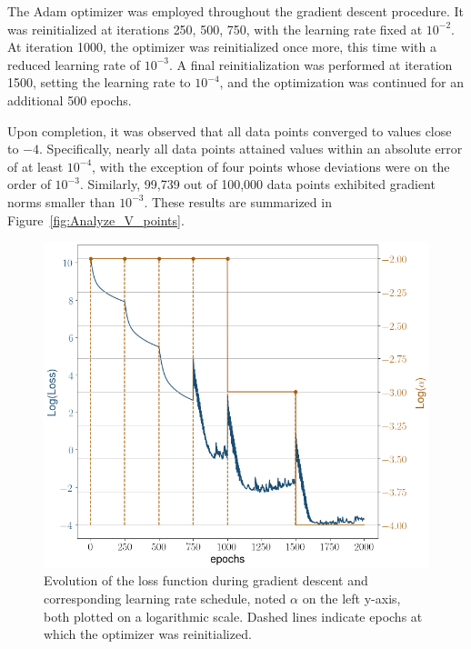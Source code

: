 \documentclass[11pt]{article}
\begin{document}
		The Adam optimizer was employed throughout the gradient descent procedure. It was reinitialized at iterations {250, 500, 750}, with the learning rate fixed at $10^{-2}$. At iteration 1000, the optimizer was reinitialized once more, this time with a reduced learning rate of $10^{-3}$. A final reinitialization was performed at iteration 1500, setting the learning rate to $10^{-4}$, and the optimization was continued for an additional 500 epochs.
		
		Upon completion, it was observed that all data points converged to values close to $-4$. Specifically, nearly all data points attained values within an absolute error of at least $10^{-4}$, with the exception of four points whose deviations were on the order of $10^{-3}$. Similarly, 99,739 out of 100,000 data points exhibited gradient norms smaller than $10^{-3}$. These results are summarized in Figure~\ref{fig:Analyze_V_points}.
		
		\begin{figure}[h!]
			\centering
			\includegraphics[scale = 0.5]{Figures/Loss_grad_des_1.png}
			\caption{Evolution of the loss function during gradient descent and corresponding learning rate schedule, noted $\alpha$ on the left y-axis, both plotted on a logarithmic scale. Dashed lines indicate epochs at which the optimizer was reinitialized.}
			\label{fig:loss_grad_des}
		\end{figure}
		
\end{document}
